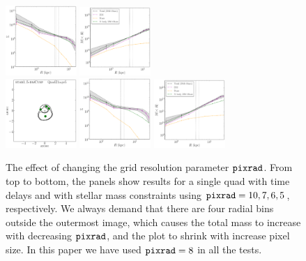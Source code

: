 \documentclass[galley,usenatbib]{mn2e}
\newcommand{\pixrad}{\ensuremath{\mathrm{\tt pixrad}}}
\begin{document}
\begin{figure}
\includegraphics[width=0.24\textwidth]{BCQuadR1a-pr6_TmS-b.pdf}
\includegraphics[width=0.24\textwidth]{BCQuadR1a-pr6_TmS-c.pdf}\\
%
\includegraphics[width=0.24\textwidth]{BCQuadR1a-pr5_TmS-a.pdf}
\includegraphics[width=0.24\textwidth]{BCQuadR1a-pr5_TmS-b.pdf}
\includegraphics[width=0.24\textwidth]{BCQuadR1a-pr5_TmS-c.pdf}\\
\caption{The effect of changing the grid resolution parameter \pixrad. From top
    to bottom, the panels show results for a single quad with time delays and
    with stellar mass constraints using $\pixrad = 10,7,6,5$,
    respectively. We always demand that there are four radial bins outside the
    outermost image, which causes the total mass to increase with decreasing
    \pixrad, and the plot to shrink with increase pixel size.  In this paper we have used $\pixrad = 8$ in all the
tests.}

\label{fig:pix_convergence_test}
\end{figure}
\end{document}
